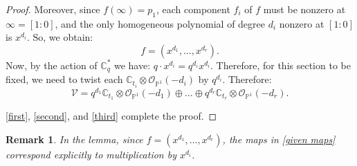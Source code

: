 \documentclass{amsart}
\newtheorem{remark}[thm]{Remark}
\begin{document}
\begin{proof}
Moreover, since $f(\infty) = p_1$, each component $f_i$ of $f$ must be nonzero at $\infty = [1:0]$, and the only homogeneous polynomial of degree $d_i$ nonzero at $[1:0]$ is $x^{d_i}$. So, we obtain:
\begin{equation}\label{second}
    f=(x^{d_1},\dots,x^{d_r}).
\end{equation}
Now, by the action of $\mathbb{C}_
q^*$ we have: $q\cdot x^{d_i} = q^{d_i}x^{d_i}$. Therefore, for this section to be fixed, we need to twist each $\mathbb{C}_{t_i}\otimes\mathcal{O}_{\mathbb{P}^1}(-d_i)$ by $q^{d_i}$. Therefore:
\begin{equation}\label{third}
    \mathcal{V} = q^{d_1}\mathbb{C}_{t_1}\otimes\mathcal{O}_{\mathbb{P}^1}(-d_1) \oplus \dots \oplus q^{d_r}\mathbb{C}_{t_r}\otimes\mathcal{O}_{\mathbb{P}^1}(-d_r).
\end{equation}

 \eqref{first}, \eqref{second}, and \eqref{third} complete the proof.
\end{proof}
\begin{remark}
    In the lemma, since $f=(x^{d_1},\dots,x^{d_r})$, the maps in \eqref{given maps} correspond explicitly to multiplication by $x^{d_i}$.
\end{remark}
\end{document}
